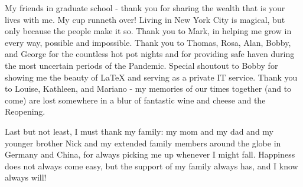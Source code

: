 \documentclass[phd,tocprelim]{cornell}
\begin{document}
\begin{acknowledgements}
My friends in graduate school - thank you for sharing the wealth that is your lives with me. My cup runneth over! Living in New York City is magical, but only because the people make it so. Thank you to Mark, in helping me grow in every way, possible and impossible. Thank you to Thomas, Rosa, Alan, Bobby, and George for the countless hot pot nights and for providing safe haven during the most uncertain periods of the Pandemic. Special shoutout to Bobby for showing me the beauty of LaTeX and serving as a private IT service. Thank you to Louise, Kathleen, and Mariano - my memories of our times together (and to come) are lost somewhere in a blur of fantastic wine and cheese and the Reopening.

Last but not least, I must thank my family: my mom and my dad and my younger brother Nick and my extended family members around the globe in Germany and China, for always picking me up whenever I might fall. Happiness does not always come easy, but the support of my family always has, and I know always will!
\end{acknowledgements}

\contentspage
\figurelistpage
\end{document}
